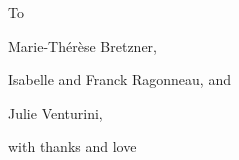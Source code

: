 %
%
%

\cleardoublepage

\vspace*{5em}
\hfill
\begin{center}
    \large
    To\par
    \vspace{1.5em}
    Marie-Th{\'{e}}r{\`{e}}se Bretzner,\par
    Isabelle and Franck Ragonneau, and\par
    Julie Venturini,\par
    \vspace{1.5em}
    with thanks and love
\end{center}
\vspace{\fill}
\thispagestyle{empty}

